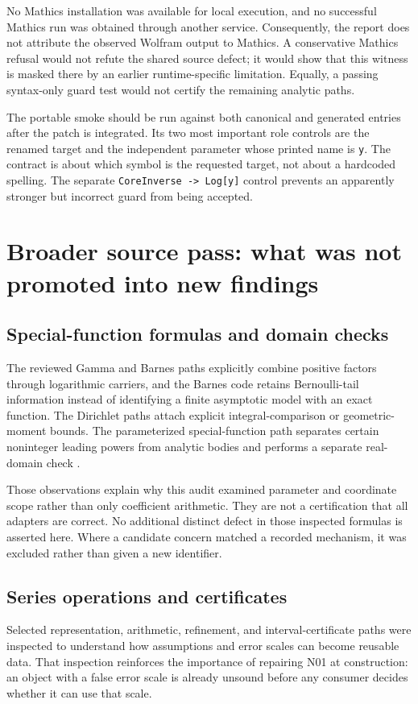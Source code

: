 \documentclass[11pt,letterpaper]{article}
\newcommand{\code}[1]{\texttt{#1}}
\begin{document}
No Mathics installation was available for local execution, and no successful Mathics run was obtained through another service. Consequently, the report does not attribute the observed Wolfram output to Mathics. A conservative Mathics refusal would not refute the shared source defect; it would show that this witness is masked there by an earlier runtime-specific limitation. Equally, a passing syntax-only guard test would not certify the remaining analytic paths.

The portable smoke should be run against both canonical and generated entries after the patch is integrated. Its two most important role controls are the renamed target and the independent parameter whose printed name is \code{y}. The contract is about which symbol is the requested target, not about a hardcoded spelling. The separate \code{CoreInverse -> Log[y]} control prevents an apparently stronger but incorrect guard from being accepted.

\section{Broader source pass: what was not promoted into new findings}
\subsection{Special-function formulas and domain checks}
The reviewed Gamma and Barnes paths explicitly combine positive factors through logarithmic carriers, and the Barnes code retains Bernoulli-tail information instead of identifying a finite asymptotic model with an exact function. The Dirichlet paths attach explicit integral-comparison or geometric-moment bounds. The parameterized special-function path separates certain noninteger leading powers from analytic bodies and performs a separate real-domain check \cite{source-map,special-sources}.

Those observations explain why this audit examined parameter and coordinate scope rather than only coefficient arithmetic. They are not a certification that all adapters are correct. No additional distinct defect in those inspected formulas is asserted here. Where a candidate concern matched a recorded mechanism, it was excluded rather than given a new identifier.

\subsection{Series operations and certificates}
Selected representation, arithmetic, refinement, and interval-certificate paths were inspected to understand how assumptions and error scales can become reusable data. That inspection reinforces the importance of repairing N01 at construction: an object with a false error scale is already unsound before any consumer decides whether it can use that scale.
\end{document}
